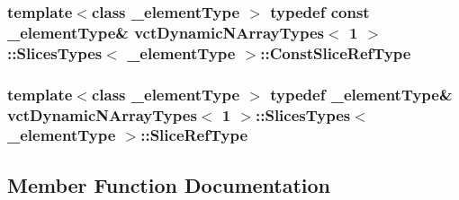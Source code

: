 \subsubsection[{Const\+Slice\+Ref\+Type}]{\setlength{\rightskip}{0pt plus 5cm}template$<$class \+\_\+element\+Type $>$ typedef const \+\_\+element\+Type\& {\bf vct\+Dynamic\+N\+Array\+Types}$<$ 1 $>$\+::Slices\+Types$<$ \+\_\+element\+Type $>$\+::{\bf Const\+Slice\+Ref\+Type}}\label{classvct_dynamic_n_array_types_3_011_01_4_1_1_slices_types_a18f8addeaaa816d30b9ed8a7e7dd8f77}
\hypertarget{classvct_dynamic_n_array_types_3_011_01_4_1_1_slices_types_a34c9917853ea79e85ef0924a9a56a60f}{}
\subsubsection[{Slice\+Ref\+Type}]{\setlength{\rightskip}{0pt plus 5cm}template$<$class \+\_\+element\+Type $>$ typedef \+\_\+element\+Type\& {\bf vct\+Dynamic\+N\+Array\+Types}$<$ 1 $>$\+::Slices\+Types$<$ \+\_\+element\+Type $>$\+::{\bf Slice\+Ref\+Type}}\label{classvct_dynamic_n_array_types_3_011_01_4_1_1_slices_types_a34c9917853ea79e85ef0924a9a56a60f}


\subsection{Member Function Documentation}
\hypertarget{classvct_dynamic_n_array_types_3_011_01_4_1_1_slices_types_a80679736dbde9c53af54d1f1de7c88ac}{}
